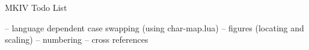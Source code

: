 MKIV Todo List

-- language dependent case swapping (using char-map.lua)
-- figures (locating and scaling)
-- numbering
-- cross references
